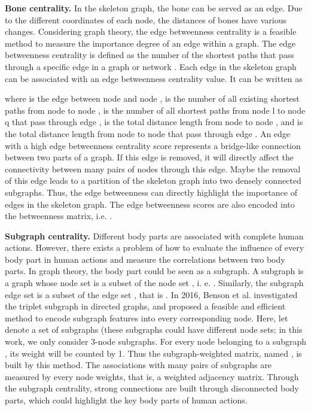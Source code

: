 \documentclass[runningheads]{llncs}
\begin{document}
\textbf{Bone centrality.} In the skeleton graph, the bone can be served as an edge. Due to the different coordinates of each node, the distances of bones have various changes. Considering graph theory, the edge betweenness centrality is a feasible method to measure the importance degree of an edge within a graph. The edge betweenness centrality is defined as the number of the shortest paths that pass through a specific edge in a graph or network \cite{girvan2002community}. Each edge in the skeleton graph can be associated with an edge betweenness centrality value. It can be written as

where  is the edge between node  and node ,  is the number of all existing shortest paths from node  to node ,  is the number of all shortest paths from node l to node q that pass through edge ,  is the total distance length from node  to node , and  is the total distance length from node  to node  that pass through edge . An edge with a high edge betweenness centrality score represents a bridge-like connection between two parts of a graph. If this edge is removed, it will directly affect the connectivity between many pairs of nodes through this edge. Maybe the removal of this edge leads to a partition of the skeleton graph into two densely connected subgraphs. Thus, the edge betweenness can directly highlight the importance of edges in the skeleton graph. The edge betweenness scores are also encoded into the betweenness matrix, i.e. . 

\textbf{Subgraph centrality.} Different body parts are associated with complete human actions. However, there exists a problem of how to evaluate the influence of every body part in human actions and measure the correlations between two body parts. In graph theory, the body part could be seen as a subgraph. A subgraph  is a graph whose node set  is a subset of the node set , i. e. . Similarly, the subgraph edge set  is a subset of the edge set , that is .  In 2016, Benson et al. \cite{andriluka2018} investigated the triplet subgraph in directed graphs, and proposed a feasible and efficient method to encode subgraph features into every corresponding node. Here, let  denote a set of subgraphs (these subgraphs could have different node sets; in this work, we only consider 3-node subgraphs. For every node belonging to a subgraph , its weight will be counted by 1. Thus the subgraph-weighted matrix, named , is built by this method. The associations with many pairs of subgraphs are measured by every node weights, that is, a weighted adjacency matrix. Through the subgraph centrality, strong connections are built through disconnected body parts, which could highlight the key body parts of human actions. 
\end{document}
